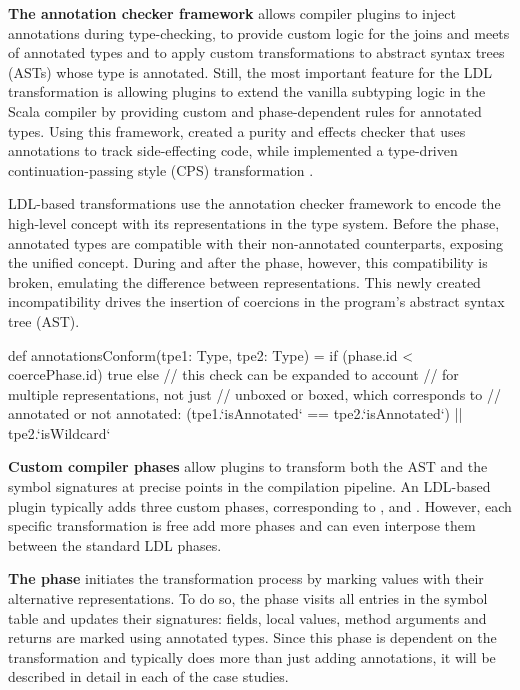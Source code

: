 \textbf{The annotation checker framework} allows compiler plugins to inject annotations during type-checking, to provide custom logic for the joins and meets of annotated types and to apply custom transformations to abstract syntax trees (ASTs) whose type is annotated. Still, the most important feature for the LDL transformation is allowing plugins to extend the vanilla subtyping logic in the Scala compiler by providing custom and phase-dependent rules for annotated types. Using this framework,  created a purity and effects checker \cite{lukas-thesis} that uses annotations to track side-effecting code, while  implemented a type-driven continuation-passing style (CPS) transformation \cite{tiark-cps}.

LDL-based transformations use the annotation checker framework to encode the high-level concept with its representations in the type system. Before the \coerce{} phase, annotated types are compatible with their non-annotated counterparts, exposing the unified concept. During and after the \coerce{} phase, however, this compatibility is broken, emulating the difference between representations. This newly created incompatibility drives the insertion of coercions in the program's abstract syntax tree (AST).

\begin{lstlisting-nobreak}
 def annotationsConform(tpe1: Type, tpe2: Type) =
   if (phase.id < coercePhase.id)
     true
   else
     // this check can be expanded to account
     // for multiple representations, not just
     // unboxed or boxed, which corresponds to
     // annotated or not annotated:
     (tpe1.`isAnnotated` == tpe2.`isAnnotated`) || tpe2.`isWildcard`
\end{lstlisting-nobreak}

\textbf{Custom compiler phases} allow plugins to transform both the AST and the symbol signatures at precise points in the compilation pipeline. An LDL-based plugin typically adds three custom phases, corresponding to \inject{}, \coerce{} and \commit{}. However, each specific transformation is free add more phases and can even interpose them between the standard LDL phases.

\textbf{The \inject{} phase} initiates the transformation process by marking values with their alternative representations. To do so, the phase visits all entries in the symbol table and updates their signatures: fields, local values, method arguments and returns are marked using annotated types. Since this phase is dependent on the transformation and typically does more than just adding annotations, it will be described in detail in each of the case studies.

